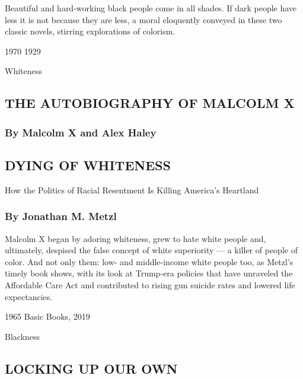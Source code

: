 Beautiful and hard-working black people come in all shades. If dark
people have less it is not because they are less, a moral eloquently
conveyed in these two classic novels, stirring explorations of colorism.

1970 \textbar{} 1929

Whiteness

\hypertarget{the-autobiography-of-malcolm-x}{%
\subsection{THE AUTOBIOGRAPHY OF MALCOLM
X}\label{the-autobiography-of-malcolm-x}}

\hypertarget{by-malcolm-x-and-alex-haley}{%
\subsubsection{\texorpdfstring{\textbf{By Malcolm X and Alex
Haley}}{By Malcolm X and Alex Haley}}\label{by-malcolm-x-and-alex-haley}}

\hypertarget{dying-of-whiteness}{%
\subsection{DYING OF WHITENESS}\label{dying-of-whiteness}}

How the Politics of Racial Resentment Is Killing America's Heartland

\hypertarget{by-jonathan-m-metzl}{%
\subsubsection{\texorpdfstring{\textbf{By Jonathan M.
Metzl}}{By Jonathan M. Metzl}}\label{by-jonathan-m-metzl}}

Malcolm X began by adoring whiteness, grew to hate white people and,
ultimately, despised the false concept of white superiority --- a killer
of people of color. And not only them: low- and middle-income white
people too, as Metzl's timely book shows, with its look at Trump-era
policies that have unraveled the Affordable Care Act and contributed to
rising gun suicide rates and lowered life expectancies.

1965 \textbar{} Basic Books, 2019

Blackness

\hypertarget{locking-up-our-own}{%
\subsection{LOCKING UP OUR OWN}\label{locking-up-our-own}}

